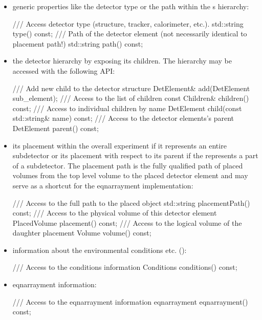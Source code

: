 \documentclass[10pt,a4paper]{article}
\begin{document}
\begin{itemize}\itemcompact
\item generic properties like the detector type or the path within the s
    hierarchy:
\begin{code}
  /// Access detector type (structure, tracker, calorimeter, etc.).
  std::string type() const;
  /// Path of the detector element (not necessarily identical to placement path!)
  std::string path() const;
\end{code}

\item the detector hierarchy by exposing its children. The hierarchy may be 
    accessed with the following API:
\begin{code}
  /// Add new child to the detector structure
  DetElement& add(DetElement sub_element);
  /// Access to the list of children
  const Children& children() const;
  /// Access to individual children by name
  DetElement child(const std::string& name) const;
  /// Access to the detector elements's parent
  DetElement parent() const;
\end{code}

\item its placement within the overall experiment if it represents an 
    entire subdetector or its placement with respect to its parent
    if the  represents a part of a subdetector.
    The placement path is the fully qualified path of placed volumes 
    from the top level volume to the placed detector element and may
    serve as a shortcut for the eqnarrayment implementation:
\begin{code}
  /// Access to the full path to the placed object
  std::string placementPath() const;
  /// Access to the physical volume of this detector element
  PlacedVolume placement() const;
  /// Access to the logical volume of the daughter placement
  Volume volume() const;
\end{code}

\item information about the environmental conditions etc. ():
\begin{code}
  /// Access to the conditions information 
  Conditions conditions() const;
\end{code}

\item eqnarrayment information:
\begin{code}
  /// Access to the eqnarrayment information
  eqnarrayment eqnarrayment() const;
\end{code}


\end{itemize}
\end{document}
